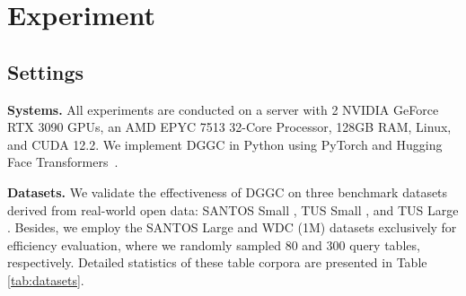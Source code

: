 \section{Experiment}
\label{exp}
\subsection{Settings}
\noindent\textbf{Systems.} %
All experiments are conducted on a server with 2 NVIDIA GeForce RTX 3090 GPUs, an AMD EPYC 7513 32-Core Processor, 128GB RAM, Linux, and CUDA 12.2. We implement DGGC in Python using PyTorch and Hugging Face Transformers~\cite{wolf2020transformers}.

\noindent\textbf{Datasets.} We validate the effectiveness of DGGC on three benchmark datasets derived from real-world open data: SANTOS Small \cite{khatiwada2023santos}, TUS Small \cite{nargesian2018table}, and TUS Large \cite{nargesian2018table}. Besides, we employ the SANTOS Large \cite{khatiwada2023santos} and WDC (1M) datasets \cite{lehmberg2016large} exclusively for efficiency evaluation, where we randomly sampled 80 and 300 query tables, respectively. Detailed statistics of these table corpora are presented in Table \ref{tab:datasets}.

